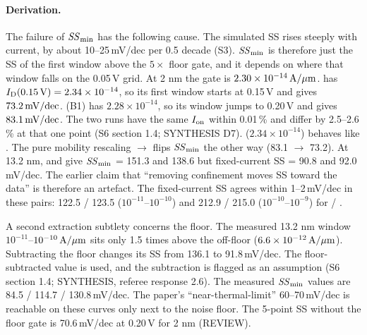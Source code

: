 \paragraph{Derivation.}
The failure of $\mathit{SS}_{\min}$ has the following cause. The simulated SS rises steeply with current, by about 10--25\,mV/dec per 0.5 decade (S3). $\mathit{SS}_{\min}$ is therefore just the SS of the first window above the $5\times$ floor gate, and it depends on where that window falls on the 0.05\,V grid. At 2 nm the gate is $2.30\times10^{-14}\,\mathrm{A}/\mu\mathrm{m}$.  has $I_{\mathrm{D}}(\SI{0.15}{V})=2.34\times10^{-14}$, so its first window starts at 0.15\,V and gives $73.2\,\mathrm{mV/dec}$.  (B1) has $2.28\times10^{-14}$, so its window jumps to 0.20\,V and gives $83.1\,\mathrm{mV/dec}$. The two runs have the same $I_{\mathrm{on}}$ within 0.01\,\% and differ by 2.5--2.6\,\% at that one point (S6 section 1.4; SYNTHESIS D7).  ($2.34\times10^{-14}$) behaves like . The pure mobility rescaling  $\rightarrow$  flips $\mathit{SS}_{\min}$ the other way (83.1 $\rightarrow$ 73.2). At 13.2 nm,  and  give $\mathit{SS}_{\min}$ = 151.3 and 138.6 but fixed-current SS = 90.8 and 92.0\,mV/dec. The earlier claim that ``removing confinement moves SS toward the data'' is therefore an artefact. The fixed-current SS agrees within 1--2\,mV/dec in these pairs: 122.5 / 123.5 ($10^{-11}$--$10^{-10}$) and 212.9 / 215.0 ($10^{-10}$--$10^{-9}$) for  / .

A second extraction subtlety concerns the floor. The measured 13.2 nm window $10^{-11}$--$10^{-10}\,\mathrm{A}/\mu\mathrm{m}$ sits only 1.5 times above the off-floor ($6.6\times10^{-12}\,\mathrm{A}/\mu\mathrm{m}$). Subtracting the floor changes its SS from 136.1 to 91.8\,mV/dec. The floor-subtracted value is used, and the subtraction is flagged as an assumption (S6 section 1.4; SYNTHESIS, referee response 2.6). The measured $\mathit{SS}_{\min}$ values are 84.5 / 114.7 / 130.8\,mV/dec. The paper's ``near-thermal-limit'' 60--70\,mV/dec is reachable on these curves only next to the noise floor. The 5-point SS without the floor gate is 70.6\,mV/dec at 0.20\,V for 2 nm (REVIEW).

